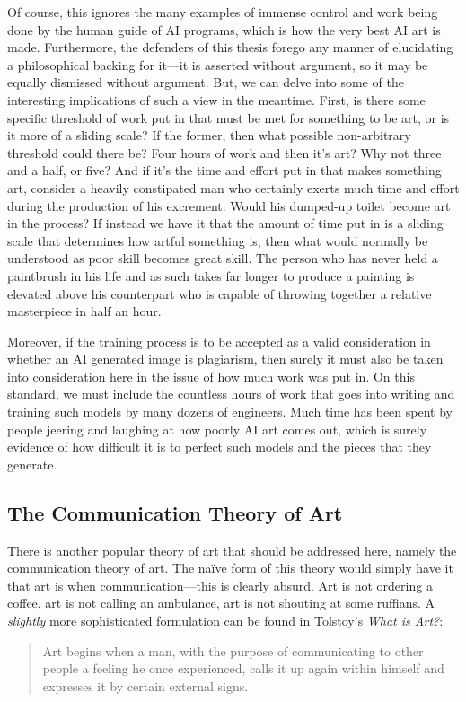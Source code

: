 \documentclass[11pt]{article}
\begin{document}
Of course, this ignores the many examples of immense control and work being done by the human guide of AI programs, which is how the very best AI art is made. Furthermore, the defenders of this thesis forego any manner of elucidating a philosophical backing for it---it is asserted without argument, so it may be equally dismissed without argument. But, we can delve into some of the interesting implications of such a view in the meantime. First, is there some specific threshold of work put in that must be met for something to be art, or is it more of a sliding scale? If the former, then what possible non-arbitrary threshold could there be? Four hours of work and then it's art? Why not three and a half, or five? And if it's the time and effort put in that makes something art, consider a heavily constipated man who certainly exerts much time and effort during the production of his excrement. Would his dumped-up toilet become art in the process? If instead we have it that the amount of time put in is a sliding scale that determines how artful something is, then what would normally be understood as poor skill becomes great skill. The person who has never held a paintbrush in his life and as such takes far longer to produce a painting is elevated above his counterpart who is capable of throwing together a relative masterpiece in half an hour.

Moreover, if the training process is to be accepted as a valid consideration in whether an AI generated image is plagiarism, then surely it must also be taken into consideration here in the issue of how much work was put in. On this standard, we must include the countless hours of work that goes into writing and training such models by many dozens of engineers. Much time has been spent by people jeering and laughing at how poorly AI art comes out, which is surely evidence of how difficult it is to perfect such models and the pieces that they generate.

\subsection*{The Communication Theory of Art}
\label{sec:org6e69206}
There is another popular theory of art that should be addressed here, namely the communication theory of art. The naïve form of this theory would simply have it that art is when communication---this is clearly absurd. Art is not ordering a coffee, art is not calling an ambulance, art is not shouting at some ruffians. A \emph{slightly} more sophisticated formulation can be found in Tolstoy's \emph{What is Art?}:
\begin{quote}
Art begins when a man, with the purpose of communicating to other people a feeling he once experienced, calls it up again within himself and expresses it by certain external signs.
\end{quote}
\end{document}

